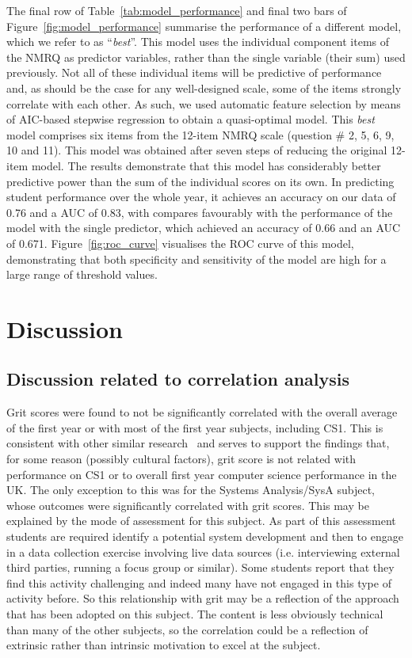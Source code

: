 \documentclass[sigconf]{acmart}
\begin{document}
The final row of Table~\ref{tab:model_performance} and final two bars of Figure~\ref{fig:model_performance} summarise the performance of a different model, which we refer to as ``{\em best}''. This model uses the individual component items of the NMRQ as predictor variables, rather than the single variable (their sum) used previously. Not all of these individual items will be predictive of performance and, as should be the case for any well-designed scale, some of the items strongly correlate with each other. As such, we used  automatic feature selection by means of AIC-based stepwise regression to obtain a quasi-optimal model. This {\em best} model comprises six items from the 12-item NMRQ scale (question \# 2, 5, 6, 9, 10 and 11). This model was obtained after seven steps of reducing the original 12-item model. The results demonstrate that this model has considerably better predictive power than the sum of the individual scores on its own. In predicting student performance over the whole year, it achieves an accuracy on our data of 0.76 and a AUC of 0.83, with compares favourably with the performance of the model with the single predictor, which achieved an accuracy of 0.66 and an AUC of 0.671. Figure~\ref{fig:roc_curve} visualises the ROC curve of this model, demonstrating that both specificity and sensitivity of the model are high for a large range of threshold values.

\section{Discussion}
\subsection{Discussion related to correlation analysis}
Grit scores were found to not be significantly correlated with the overall average of the first year or with most of the first year subjects, including CS1. This is consistent with other similar research~\cite{Sigurdson:2018:EGC:3279720.3279743} and serves to support the findings that, for some reason (possibly cultural factors), grit score is not related with performance on CS1 or to overall first year computer science performance in the UK. The only exception to this was for the Systems Analysis/SysA subject, whose outcomes were significantly correlated with grit scores. This may be explained by the mode of assessment for this subject. As part of this assessment students are required identify a potential system development and then to engage in a data collection exercise involving live data sources (i.e. interviewing external third parties, running a focus group or similar). Some students report that they find this activity challenging and indeed many have not engaged in this type of activity before. So this relationship with grit may be a reflection of the approach that has been adopted on this subject. The content is less obviously technical than many of the other subjects, so the correlation could be a reflection of extrinsic rather than intrinsic motivation to excel at the subject.
\end{document}
